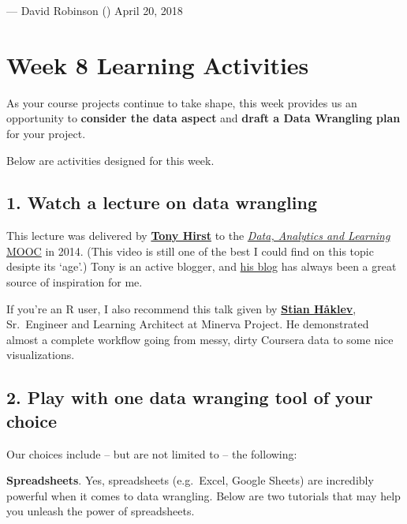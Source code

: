 \documentclass[
]{book}
\begin{document}
--- David Robinson (\citet{drob}) April 20, 2018

\hypertarget{week-8-learning-activities}{%
\section{Week 8 Learning Activities}\label{week-8-learning-activities}}

As your course projects continue to take shape, this week provides us an opportunity to \textbf{consider the data aspect} and \textbf{draft a Data Wrangling plan} for your project.

Below are activities designed for this week.

\hypertarget{watch-a-lecture-on-data-wrangling}{%
\subsection*{1. Watch a lecture on data wrangling}\label{watch-a-lecture-on-data-wrangling}}

This lecture was delivered by \href{https://blog.ouseful.info/about/}{\textbf{Tony Hirst}} to the \href{https://www.edx.org/course/data-analytics-learning-utarlingtonx-link5-10x}{\emph{Data, Analytics and Learning} MOOC} in 2014. (This video is still one of the best I could find on this topic desipte its `age'.) Tony is an active blogger, and \href{https://blog.ouseful.info/}{his blog} has always been a great source of inspiration for me.

If you're an R user, I also recommend this talk given by \href{https://ch.linkedin.com/in/stianhaklev}{\textbf{Stian Håklev}}, Sr.~Engineer and Learning Architect at Minerva Project. He demonstrated almost a complete workflow going from messy, dirty Coursera data to some nice visualizations.

\hypertarget{play-with-one-data-wranging-tool-of-your-choice}{%
\subsection*{2. Play with one data wranging tool of your choice}\label{play-with-one-data-wranging-tool-of-your-choice}}

Our choices include -- but are not limited to -- the following:

\textbf{Spreadsheets}. Yes, spreadsheets (e.g.~Excel, Google Sheets) are incredibly powerful when it comes to data wrangling. Below are two tutorials that may help you unleash the power of spreadsheets.
\end{document}

